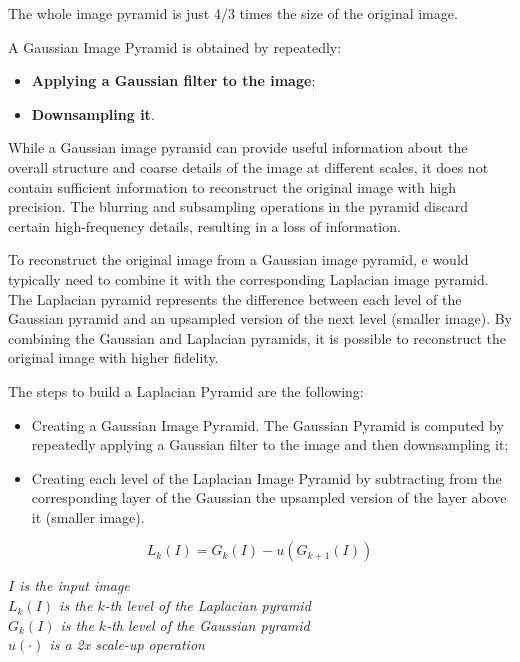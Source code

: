 \documentclass{article}
\begin{document}
The whole image pyramid is just 4/3 times the size of the original image.

A Gaussian Image Pyramid is obtained by repeatedly:
\begin{itemize}
    \item \textbf{Applying a Gaussian filter to the image};
    \item \textbf{Downsampling it}.
\end{itemize}

While a Gaussian image pyramid can provide useful information about the overall structure and coarse details of the image at different scales, it does not contain sufficient information to reconstruct the original image with high precision. The blurring and subsampling operations in the pyramid discard certain high-frequency details, resulting in a loss of information.

To reconstruct the original image from a Gaussian image pyramid, e would typically need to combine it with the corresponding Laplacian image pyramid. The Laplacian pyramid represents the difference between each level of the Gaussian pyramid and an upsampled version of the next level (smaller image). By combining the Gaussian and Laplacian pyramids, it is possible to reconstruct the original image with higher fidelity.

The steps to build a Laplacian Pyramid are the following:

\begin{itemize}
    \item Creating a Gaussian Image Pyramid. The Gaussian Pyramid is computed by repeatedly applying a Gaussian filter to the image and then downsampling it;
    \item Creating each level of the Laplacian Image Pyramid by subtracting from the corresponding layer of the Gaussian the upsampled version of the layer above it (smaller image).
\end{itemize}

\begin{equation*}
    L_k(I) = G_k(I) - u(G_{k+1}(I))
\end{equation*}

\begin{center}
    \textit{$I$ is the input image} \\
    \textit{$L_k(I)$ is the $k$-th level of the Laplacian pyramid} \\
    \textit{$G_k(I)$ is the $k$-th level of the Gaussian pyramid} \\
    \textit{$u(\cdot)$ is a 2x scale-up operation}
\end{center}
\end{document}

